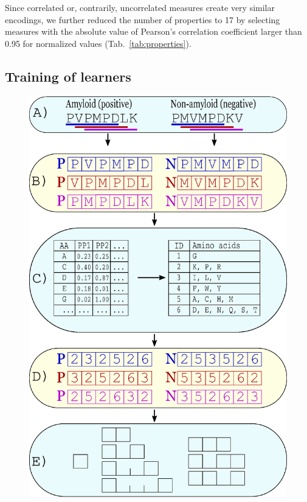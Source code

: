 \documentclass[a4,center,fleqn]{NAR}
\begin{document}
  Since correlated or, contrarily, uncorrelated measures create very similar 
%
%
%
encodings, we further reduced the number of properties to 17 by selecting 
%
%
%
measures with the absolute value of Pearson's correlation coefficient larger 
than 0.95 for normalized values (Tab.~\ref{tab:properties}).

\subsection{Training of learners}

\begin{figure}[!tpb]
\centerline{\includegraphics[width=\columnwidth]{figures/ngram_scheme.eps}}

\end{figure}
\end{document}

